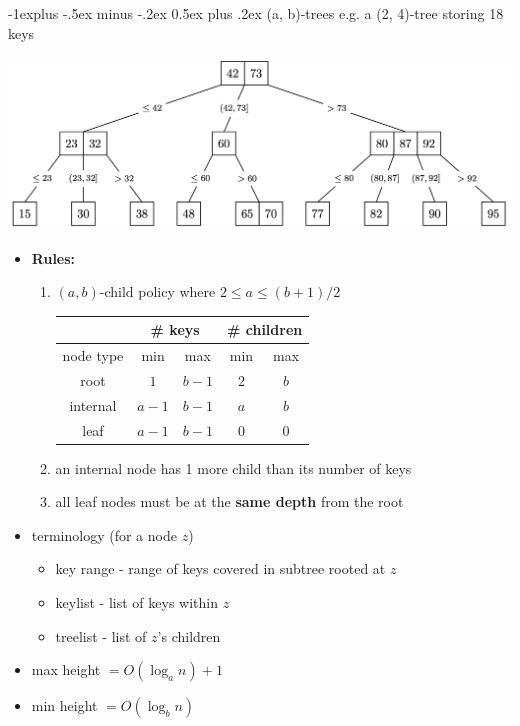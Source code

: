 \documentclass[10pt, landscape]{article}
\makeatletter
\renewcommand{\subsection}{\@startsection{subsection}{2}{0.1mm}%
                                {-1explus -.5ex minus -.2ex}%
                                {0.5ex plus .2ex}%
                                {\normalfont\normalsize\bfseries}}
\makeatother
\begin{document}
\begin{multicols}{4}
\subsection{(a, b)-trees}
{\scriptsize{e.g. a (2, 4)-tree storing 18 keys}}
	\centerline{\includegraphics[width=0.7\linewidth]{cs2040s-ab-tree.png}}
\begin{itemize}
    \item \textbf{Rules:}
    \begin{enumerate}
        \item $(a, b)$-child policy where $2 \leq a \leq (b+1)/2$
        \begin{tabular}{|c|c|c|c|c|}
            \hline 
             & \multicolumn{2}{c|}{\# keys} & \multicolumn{2}{c|}{\# children}
            \\\hline
            node type & min & max & min & max
            \\\hline
            root & $1$ & $b-1$ & $2$ & $b$
            \\\hline
            internal & $a-1$ & $b-1$ & $a$ & $b$
            \\\hline
            leaf & $a-1$ & $b-1$ & $0$ & $0$
            \\\hline
        \end{tabular}
        \item an internal node has 1 more child than its number of keys
        \item all leaf nodes must be at the \textbf{same depth} from the root
    \end{enumerate}
    \item terminology (for a node $z$)
    \begin{itemize}
        \item key range - range of keys covered in subtree rooted at $z$
        \item keylist - list of keys within $z$
        \item treelist - list of $z$'s children
    \end{itemize}
    \item max height $= O(\log_an) + 1$
    \item min height $= O(\log_bn)$

\end{itemize}
\end{multicols}
\end{document}
